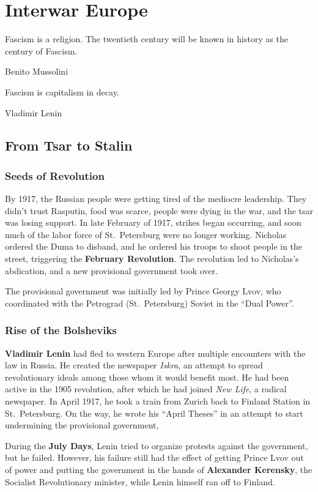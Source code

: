 \chapter{Interwar Europe}

\epigraph{%
  Fascism is a religion. The twentieth century will be known in history as the century of Fascism.
}{Benito Mussolini}

\epigraph{%
  Fascism is capitalism in decay.
}{Vladimir Lenin}

\section{From Tsar to Stalin}

\subsection*{Seeds of Revolution}

By 1917, the Russian people were getting tired of the mediocre leadership.
They didn't trust Rasputin, food was scarce, people were dying in the war, and the tsar was losing support.
In late February of 1917, strikes began occurring,
and soon much of the labor force of St.\ Petersburg were no longer working.
Nicholas ordered the Duma to disband, and he ordered his troops to shoot people in the street,
triggering the \textbf{February Revolution}.
The revolution led to Nicholas's abdication, and a new provisional government took over.

The provisional government was initially led by Prince Georgy Lvov,
who coordinated with the Petrograd (St.\ Petersburg) Soviet in the ``Dual Power''.

\subsection*{Rise of the Bolsheviks}

\textbf{Vladimir Lenin} had fled to western Europe after multiple encounters with the law in Russia.
He created the newspaper \textit{Iskra},
an attempt to spread revolutionary ideals among those whom it would benefit most.
He had been active in the 1905 revolution, after which he had joined \textit{New Life}, a radical newspaper.
In April 1917, he took a train from Zurich back to Finland Station in St.\ Petersburg.
On the way, he wrote his ``April Theses'' in an attempt to start undermining the provisional government,

During the \textbf{July Days}, Lenin tried to organize protests against the government, but he failed.
However, his failure still had the effect of getting Prince Lvov out of power
and putting the government in the hands of \textbf{Alexander Kerensky},
the Socialist Revolutionary minister,
while Lenin himself ran off to Finland.

